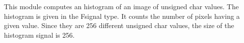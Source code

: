 This module computes an histogram of an image of unsigned char values.
The histogram is given in the Fsignal type.
It counts the number of pixels having a given value.
Since they are 256 different unsigned char values, the size of the 
histogram signal is 256.








